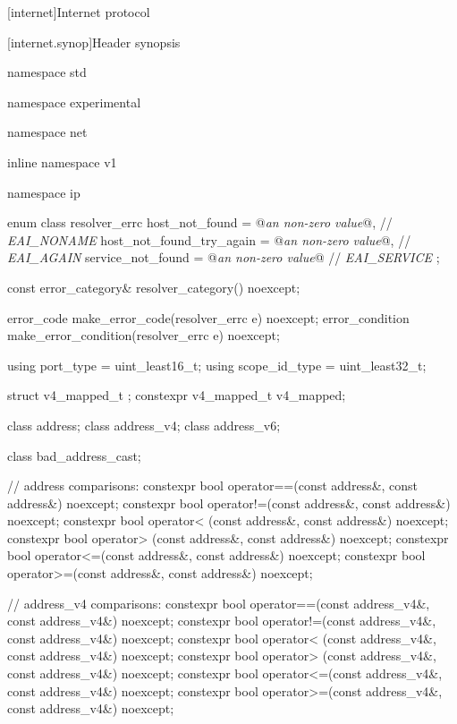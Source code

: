 
[internet]{Internet protocol}


%
[internet.synop]{Header  synopsis}

%
%
%
%
%
\begin{codeblock}
namespace std {
namespace experimental {
namespace net {
inline namespace v1 {
namespace ip {

  enum class resolver_errc {
    host_not_found = @\textit{an  non-zero value}@, // \textit{EAI_NONAME}
    host_not_found_try_again = @\textit{an  non-zero value}@, // \textit{EAI_AGAIN}
    service_not_found = @\textit{an  non-zero value}@ // \textit{EAI_SERVICE}
  };

  const error_category& resolver_category() noexcept;

  error_code make_error_code(resolver_errc e) noexcept;
  error_condition make_error_condition(resolver_errc e) noexcept;

  using port_type = uint_least16_t;
  using scope_id_type = uint_least32_t;

  struct v4_mapped_t {};
  constexpr v4_mapped_t v4_mapped;

  class address;
  class address_v4;
  class address_v6;

  class bad_address_cast;

  // address comparisons:
  constexpr bool operator==(const address&, const address&) noexcept;
  constexpr bool operator!=(const address&, const address&) noexcept;
  constexpr bool operator< (const address&, const address&) noexcept;
  constexpr bool operator> (const address&, const address&) noexcept;
  constexpr bool operator<=(const address&, const address&) noexcept;
  constexpr bool operator>=(const address&, const address&) noexcept;

  // address_v4 comparisons:
  constexpr bool operator==(const address_v4&, const address_v4&) noexcept;
  constexpr bool operator!=(const address_v4&, const address_v4&) noexcept;
  constexpr bool operator< (const address_v4&, const address_v4&) noexcept;
  constexpr bool operator> (const address_v4&, const address_v4&) noexcept;
  constexpr bool operator<=(const address_v4&, const address_v4&) noexcept;
  constexpr bool operator>=(const address_v4&, const address_v4&) noexcept;

}}}}}
\end{codeblock}
